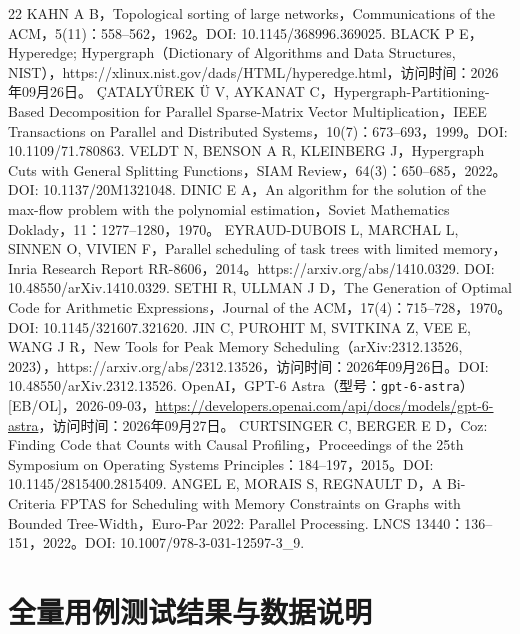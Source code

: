\documentclass[anonymous,withtoc]{gmcm2026}
\renewcommand{\thefigure}{\thesubsection-\arabic{figure}}
\begin{document}
\begin{thebibliography}{22}
 KAHN A B，Topological sorting of large networks，Communications of the ACM，5(11)：558--562，1962。DOI: 10.1145/368996.369025.
 BLACK P E，Hyperedge; Hypergraph（Dictionary of Algorithms and Data Structures, NIST），https://xlinux.nist.gov/dads/HTML/hyperedge.html，访问时间：2026年09月26日。
 ÇATALYÜREK Ü V, AYKANAT C，Hypergraph-Partitioning-Based Decomposition for Parallel Sparse-Matrix Vector Multiplication，IEEE Transactions on Parallel and Distributed Systems，10(7)：673--693，1999。DOI: 10.1109/71.780863.
 VELDT N, BENSON A R, KLEINBERG J，Hypergraph Cuts with General Splitting Functions，SIAM Review，64(3)：650--685，2022。DOI: 10.1137/20M1321048.
 DINIC E A，An algorithm for the solution of the max-flow problem with the polynomial estimation，Soviet Mathematics Doklady，11：1277--1280，1970。
 EYRAUD-DUBOIS L, MARCHAL L, SINNEN O, VIVIEN F，Parallel scheduling of task trees with limited memory，Inria Research Report RR-8606，2014。https://arxiv.org/abs/1410.0329. DOI: 10.48550/arXiv.1410.0329.
 SETHI R, ULLMAN J D，The Generation of Optimal Code for Arithmetic Expressions，Journal of the ACM，17(4)：715--728，1970。DOI: 10.1145/321607.321620.
 JIN C, PUROHIT M, SVITKINA Z, VEE E, WANG J R，New Tools for Peak Memory Scheduling（arXiv:2312.13526, 2023），https://arxiv.org/abs/2312.13526，访问时间：2026年09月26日。DOI: 10.48550/arXiv.2312.13526.
 OpenAI，GPT-6 Astra（型号：\texttt{gpt-6-astra}）[EB/OL]，2026-09-03，\url{https://developers.openai.com/api/docs/models/gpt-6-astra}，访问时间：2026年09月27日。
 CURTSINGER C, BERGER E D，Coz: Finding Code that Counts with Causal Profiling，Proceedings of the 25th Symposium on Operating Systems Principles：184--197，2015。DOI: 10.1145/2815400.2815409.
 ANGEL E, MORAIS S, REGNAULT D，A Bi-Criteria FPTAS for Scheduling with Memory Constraints on Graphs with Bounded Tree-Width，Euro-Par 2022: Parallel Processing. LNCS 13440：136--151，2022。DOI: 10.1007/978-3-031-12597-3\_9.
\end{thebibliography}

\appendix
{}
\renewcommand{\thefigure}{\thesection-\arabic{figure}}
\section{全量用例测试结果与数据说明}
\end{document}
